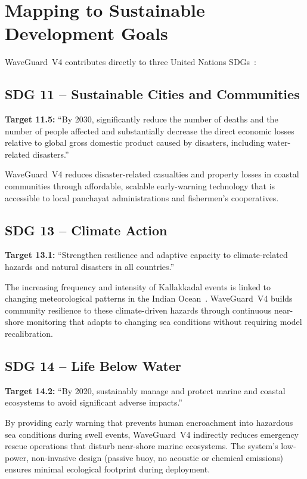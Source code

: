 \section{Mapping to Sustainable Development Goals}

WaveGuard~V4 contributes directly to three United Nations SDGs~\cite{un2015sdgs}:

\subsection*{SDG 11 – Sustainable Cities and Communities}

\textbf{Target 11.5:} ``By 2030, significantly reduce the number of deaths and the
number of people affected and substantially decrease the direct economic losses
relative to global gross domestic product caused by disasters, including water-related
disasters.''

WaveGuard~V4 reduces disaster-related casualties and property losses in coastal
communities through affordable, scalable early-warning technology that is accessible
to local panchayat administrations and fishermen's cooperatives.

\subsection*{SDG 13 – Climate Action}

\textbf{Target 13.1:} ``Strengthen resilience and adaptive capacity to climate-related
hazards and natural disasters in all countries.''

The increasing frequency and intensity of Kallakkadal events is linked to changing
meteorological patterns in the Indian Ocean~\cite{remya2016teleconnection}.
WaveGuard~V4 builds community resilience to these climate-driven hazards through
continuous near-shore monitoring that adapts to changing sea conditions without
requiring model recalibration.

\subsection*{SDG 14 – Life Below Water}

\textbf{Target 14.2:} ``By 2020, sustainably manage and protect marine and coastal
ecosystems to avoid significant adverse impacts.''

By providing early warning that prevents human encroachment into hazardous sea
conditions during swell events, WaveGuard~V4 indirectly reduces emergency rescue
operations that disturb near-shore marine ecosystems.
The system's low-power, non-invasive design (passive buoy, no acoustic or chemical
emissions) ensures minimal ecological footprint during deployment.


